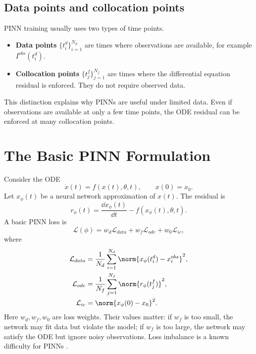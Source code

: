 \documentclass[11pt,a4paper]{article}
\begin{document}
\subsection{Data points and collocation points}
PINN training usually uses two types of time points.
\begin{itemize}[leftmargin=2em]
    \item \textbf{Data points} $\{t_i^{d}\}_{i=1}^{N_d}$ are times where observations are available, for example $I^{obs}(t_i^d)$.
    \item \textbf{Collocation points} $\{t_j^{f}\}_{j=1}^{N_f}$ are times where the differential equation residual is enforced. They do not require observed data.
\end{itemize}

This distinction explains why PINNs are useful under limited data. Even if observations are available at only a few time points, the ODE residual can be enforced at many collocation points.

\section{The Basic PINN Formulation}

Consider the ODE
\begin{equation}
    \dot{x}(t)=f(x(t),\theta,t), \qquad x(0)=x_0.
\end{equation}
Let $x_\phi(t)$ be a neural network approximation of $x(t)$. The residual is
\begin{equation}
    r_\phi(t)=\frac{\dd x_\phi(t)}{\dd t}-f(x_\phi(t),\theta,t).
\end{equation}
A basic PINN loss is
\begin{equation}
    \mathcal{L}(\phi)=w_d\mathcal{L}_{data}+w_f\mathcal{L}_{ode}+w_0\mathcal{L}_{ic},
\end{equation}
where
\begin{align}
    \mathcal{L}_{data} &= \frac{1}{N_d}\sum_{i=1}^{N_d}\norm{x_\phi(t_i^d)-x_i^{obs}}^2,\\
    \mathcal{L}_{ode} &= \frac{1}{N_f}\sum_{j=1}^{N_f}\norm{r_\phi(t_j^f)}^2,\\
    \mathcal{L}_{ic} &= \norm{x_\phi(0)-x_0}^2.
\end{align}
Here $w_d,w_f,w_0$ are loss weights. Their values matter: if $w_f$ is too small, the network may fit data but violate the model; if $w_f$ is too large, the network may satisfy the ODE but ignore noisy observations. Loss imbalance is a known difficulty for PINNs \cite{wang2021lossimbalance,krishnapriyan2021pinnfailures}.
\end{document}
